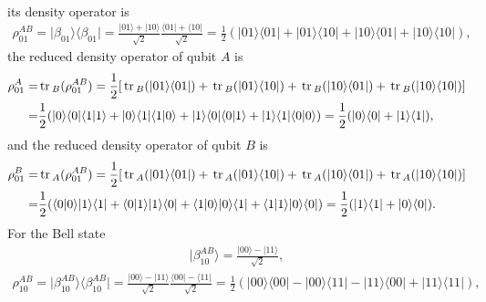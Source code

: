 \documentclass[en]{sol-man}
\begin{document}
\begin{sol}
\begin{align}
    \end{align}
    its density operator is
    \begin{align}
        \rho_{01}^{AB}=\lvert\beta_{01}\rangle\langle\beta_{01}\rvert=\frac{\lvert 01\rangle+\lvert 10\rangle}{\sqrt{2}}\frac{\langle 01\rvert+\langle 10\rvert}{\sqrt{2}}=\frac{1}{2}(\lvert 01\rangle\langle 01\rvert+\lvert 01\rangle\langle 10\rvert+\lvert 10\rangle\langle 01\rvert+\lvert 10\rangle\langle 10\rvert),
    \end{align}
    the reduced density operator of qubit $A$ is
    \begin{align}
        \notag\rho_{01}^A=&\,\mathrm{tr}\,_B(\rho_{01}^{AB})=\frac{1}{2}[\,\mathrm{tr}\,_B(\lvert 01\rangle\langle 01\rvert)+\,\mathrm{tr}\,_B(\lvert 01\rangle\langle 10\rvert)+\,\mathrm{tr}\,_B(\lvert 10\rangle\langle 01\rvert)+\,\mathrm{tr}\,_B(\lvert 10\rangle\langle 10\rvert)]\\
        =&\frac{1}{2}(\lvert 0\rangle\langle 0\rvert\langle 1\vert 1\rangle+\lvert 0\rangle\langle 1\rvert\langle 1\vert 0\rangle+\lvert 1\rangle\langle 0\rvert\langle 0\vert 1\rangle+\lvert 1\rangle\langle 1\rvert\langle 0\vert 0\rangle)=\frac{1}{2}(\lvert 0\rangle\langle 0\rvert+\lvert 1\rangle\langle 1\rvert),
    \end{align}
    and the reduced density operator of qubit $B$ is
    \begin{align}
        \notag\rho_{01}^B=&\,\mathrm{tr}\,_A(\rho_{01}^{AB})=\frac{1}{2}[\,\mathrm{tr}\,_A(\lvert 01\rangle\langle 01\rvert)+\,\mathrm{tr}\,_A(\lvert 01\rangle\langle 10\rvert)+\,\mathrm{tr}\,_A(\lvert 10\rangle\langle 01\rvert)+\,\mathrm{tr}\,_A(\lvert 10\rangle\langle 10\rvert)]\\
        =&\frac{1}{2}(\langle 0\vert 0\rangle\lvert 1\rangle\langle 1\rvert+\langle 0\vert 1\rangle\lvert 1\rangle\langle 0\rvert+\langle 1\vert 0\rangle\lvert 0\rangle\langle 1\rvert+\langle 1\vert 1\rangle\lvert 0\rangle\langle 0\rvert)=\frac{1}{2}(\lvert 1\rangle\langle 1\rvert+\lvert 0\rangle\langle 0\rvert).
    \end{align}
    For the Bell state
    \begin{align}
        \lvert\beta_{10}^{AB}\rangle=\frac{\lvert 00\rangle-\lvert 11\rangle}{\sqrt{2}},
    \end{align}
    \begin{align}
        \rho_{10}^{AB}=\lvert\beta_{10}^{AB}\rangle\langle\beta_{10}^{AB}\rvert=\frac{\lvert 00\rangle-\lvert 11\rangle}{\sqrt{2}}\frac{\langle 00\rvert-\langle 11\rvert}{\sqrt{2}}=\frac{1}{2}(\lvert 00\rangle\langle 00\rvert-\lvert 00\rangle\langle 11\rvert-\lvert 11\rangle\langle 00\rvert+\lvert 11\rangle\langle 11\rvert),

\end{align}
\end{sol}
\end{document}
